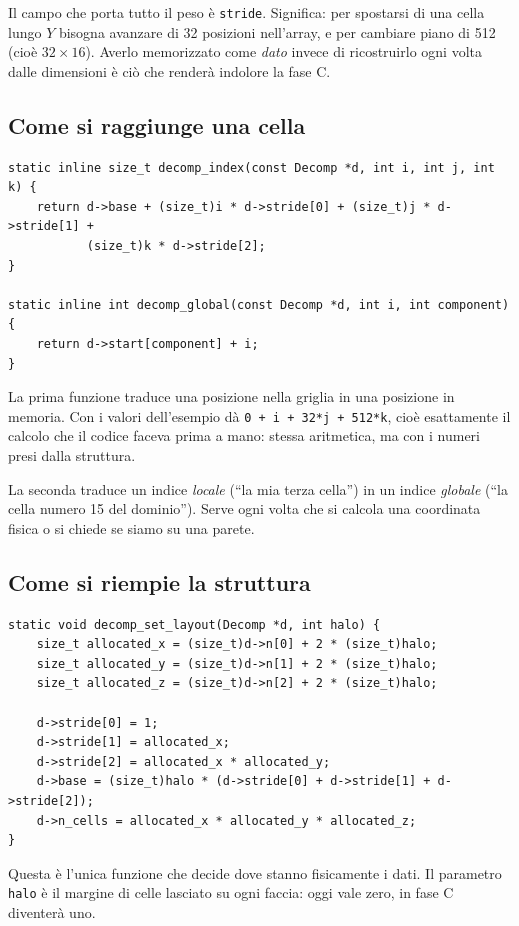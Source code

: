 \documentclass[11pt,a4paper]{article}
\newcommand{\cd}[1]{\texttt{\small #1}}
\begin{document}
Il campo che porta tutto il peso è \cd{stride}. Significa: per spostarsi di una
cella lungo $Y$ bisogna avanzare di 32 posizioni nell'array, e per cambiare
piano di 512 (cioè $32\times16$). Averlo memorizzato come \emph{dato} invece di
ricostruirlo ogni volta dalle dimensioni è ciò che renderà indolore la fase C.

\subsection*{Come si raggiunge una cella}

\begin{lstlisting}
static inline size_t decomp_index(const Decomp *d, int i, int j, int k) {
    return d->base + (size_t)i * d->stride[0] + (size_t)j * d->stride[1] +
           (size_t)k * d->stride[2];
}

static inline int decomp_global(const Decomp *d, int i, int component) {
    return d->start[component] + i;
}
\end{lstlisting}

La prima funzione traduce una posizione nella griglia in una posizione in
memoria. Con i valori dell'esempio dà \cd{0 + i + 32*j + 512*k}, cioè
esattamente il calcolo che il codice faceva prima a mano: stessa aritmetica, ma
con i numeri presi dalla struttura.

La seconda traduce un indice \emph{locale} (``la mia terza cella'') in un indice
\emph{globale} (``la cella numero 15 del dominio''). Serve ogni volta che si
calcola una coordinata fisica o si chiede se siamo su una parete.

\subsection*{Come si riempie la struttura}

\begin{lstlisting}
static void decomp_set_layout(Decomp *d, int halo) {
    size_t allocated_x = (size_t)d->n[0] + 2 * (size_t)halo;
    size_t allocated_y = (size_t)d->n[1] + 2 * (size_t)halo;
    size_t allocated_z = (size_t)d->n[2] + 2 * (size_t)halo;

    d->stride[0] = 1;
    d->stride[1] = allocated_x;
    d->stride[2] = allocated_x * allocated_y;
    d->base = (size_t)halo * (d->stride[0] + d->stride[1] + d->stride[2]);
    d->n_cells = allocated_x * allocated_y * allocated_z;
}
\end{lstlisting}

Questa è l'unica funzione che decide dove stanno fisicamente i dati.
Il parametro \cd{halo} è il margine di celle lasciato su ogni faccia: oggi vale
zero, in fase C diventerà uno.
\end{document}
